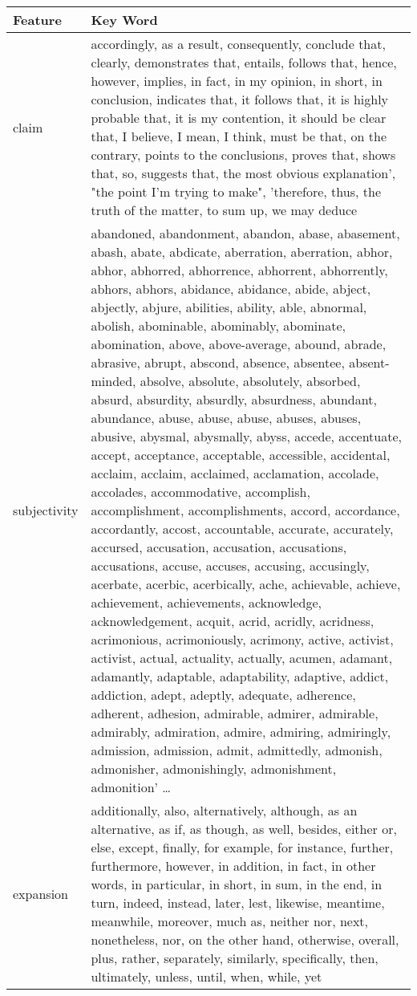 \begin{longtable}{p{2 cm}  p{12cm} }
	\bf Feature & \bf Key Word \\
	\endfirsthead
	\toprule
	claim  & accordingly, as a result, consequently, conclude that, clearly, demonstrates that, entails, follows that, hence, however, implies, in fact, in my opinion, in short, in conclusion, indicates that, it follows that, it is highly probable that, it is my contention, it should be clear that, I believe, I mean, I think, must be that, on the contrary, points to the conclusions, proves that, shows that, so, suggests that, the most obvious explanation', "the point I'm trying to make", 'therefore, thus, the truth of the matter, to sum up, we may deduce\\
	\hline
	subjectivity  & abandoned, abandonment, abandon, abase, abasement, abash, abate, abdicate, aberration, aberration, abhor, abhor, abhorred, abhorrence, abhorrent, abhorrently, abhors, abhors, abidance, abidance, abide, abject, abjectly, abjure, abilities, ability, able, abnormal, abolish, abominable, abominably, abominate, abomination, above, above-average, abound, abrade, abrasive, abrupt, abscond, absence, absentee, absent-minded, absolve, absolute, absolutely, absorbed, absurd, absurdity, absurdly, absurdness, abundant, abundance, abuse, abuse, abuse, abuses, abuses, abusive, abysmal, abysmally, abyss, accede, accentuate, accept, acceptance, acceptable, accessible, accidental, acclaim, acclaim, acclaimed, acclamation, accolade, accolades, accommodative, accomplish, accomplishment, accomplishments, accord, accordance, accordantly, accost, accountable, accurate, accurately, accursed, accusation, accusation, accusations, accusations, accuse, accuses, accusing, accusingly, acerbate, acerbic, acerbically, ache, achievable, achieve, achievement, achievements, acknowledge, acknowledgement, acquit, acrid, acridly, acridness, acrimonious, acrimoniously, acrimony, active, activist, activist, actual, actuality, actually, acumen, adamant, adamantly, adaptable, adaptability, adaptive, addict, addiction, adept, adeptly, adequate, adherence, adherent, adhesion, admirable, admirer, admirable, admirably, admiration, admire, admiring, admiringly, admission, admission, admit, admittedly, admonish, admonisher, admonishingly, admonishment, admonition' \dots \\
	\hline
	expansion  & additionally, also, alternatively, although, as an alternative, as if, as though, as well, besides, either or, else, except, finally, for example, for instance, further, furthermore, however, in addition, in fact, in other words, in particular, in short, in sum, in the end, in turn, indeed, instead, later, lest, likewise, meantime, meanwhile, moreover, much as, neither nor, next, nonetheless, nor, on the other hand, otherwise, overall, plus, rather, separately, similarly, specifically, then, ultimately, unless, until, when, while, yet\\

\end{longtable}
